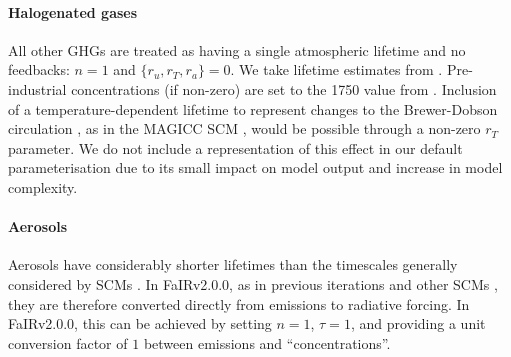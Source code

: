 \documentclass[gmd, manuscript]{copernicus}
\begin{document}
\paragraph*{Halogenated gases}
All other GHGs are treated as having a single atmospheric lifetime and no feedbacks: $n=1$ and $\{r_u,r_T,r_a\}=0$. We take lifetime estimates from \cite{WMOAppA}. Pre-industrial concentrations (if non-zero) are set to the 1750 value from \cite{Meinshausen2017}. Inclusion of a temperature-dependent lifetime to represent changes to the Brewer-Dobson circulation \citep{Butchart2001}, as in the MAGICC SCM \citep{Meinshausen2011}, would be possible through a non-zero $r_T$ parameter. We do not include a representation of this effect in our default parameterisation due to its small impact on model output and increase in model complexity.
\paragraph*{Aerosols}
Aerosols have considerably shorter lifetimes than the timescales generally considered by SCMs \citep{Kristiansen2016}. In FaIRv2.0.0, as in previous iterations \citep{Smith2018} and other SCMs \citep{Meinshausen2011}, they are therefore converted directly from emissions to radiative forcing. In FaIRv2.0.0, this can be achieved by setting $n=1$, $\tau=1$, and providing a unit conversion factor of $1$ between emissions and ``concentrations''.
\end{document}
